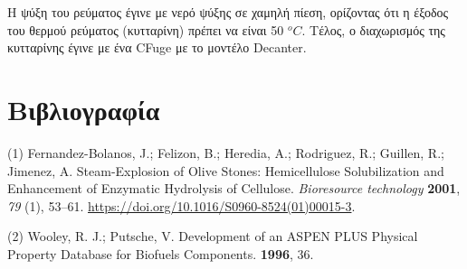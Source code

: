 \documentclass[11pt]{article}
\begin{document}
Η ψύξη του ρεύματος έγινε με νερό ψύξης σε χαμηλή πίεση, ορίζοντας ότι η έξοδος του θερμού ρεύματος (κυτταρίνη) πρέπει να είναι 50 \(^oC\). Τέλος, ο διαχωρισμός της κυτταρίνης έγινε με ένα CFuge με το μοντέλο Decanter.

\section{Βιβλιογραφία}
\label{sec:orgbc496c1}
\hypertarget{citeproc_bib_item_1}{(1) Fernandez-Bolanos, J.; Felizon, B.; Heredia, A.; Rodriguez, R.; Guillen, R.; Jimenez, A. Steam-Explosion of Olive Stones: Hemicellulose Solubilization and Enhancement of Enzymatic Hydrolysis of Cellulose. \textit{Bioresource technology} \textbf{2001}, \textit{79} (1), 53–61. \url{https://doi.org/10.1016/S0960-8524(01)00015-3}.}

\hypertarget{citeproc_bib_item_2}{(2) Wooley, R. J.; Putsche, V. Development of an ASPEN PLUS Physical Property Database for Biofuels Components. \textbf{1996}, 36.}
\end{document}
